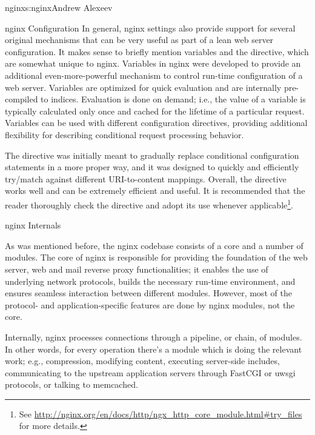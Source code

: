 \begin{aosachapter}{nginx}{s:nginx}{Andrew Alexeev}
\begin{aosasect1}{nginx Configuration}
In general, nginx settings also provide support for several original
mechanisms that can be very useful as part of a lean web server
configuration. It makes sense to briefly mention variables and the
 directive, which are somewhat unique to
nginx. Variables in nginx were developed to provide an additional 
even-more-powerful mechanism to control run-time configuration of a web
server. Variables are optimized for quick evaluation and are
internally pre-compiled to indices. Evaluation is done on demand;
i.e., the value of a variable is typically calculated only once and
cached for the lifetime of a particular request. Variables can be used
with different configuration directives, providing additional
flexibility for describing conditional request processing
behavior. 

The  directive was initially meant to
gradually replace conditional  configuration statements in a
more proper way, and it was designed to quickly and efficiently
try/match against different URI-to-content mappings. Overall, the
 directive works well and can be extremely efficient
and useful. It is recommended that the reader thoroughly check the
 directive and adopt its use whenever
applicable\footnote{See
  \url{http://nginx.org/en/docs/http/ngx_http_core_module.html#try_files}
  for more details.}.

\end{aosasect1}

\begin{aosasect1}{nginx Internals} \label{sec.nginx.internals}

As was mentioned before, the nginx codebase consists of a core and a
number of modules. The core of nginx is responsible for providing the
foundation of the web server, web and mail reverse proxy
functionalities; it enables the use of underlying network protocols,
builds the necessary run-time environment, and ensures seamless
interaction between different modules. However, most of the protocol-
and application-specific features are done by nginx modules, not the
core.

Internally, nginx processes connections through a pipeline, or chain,
of modules. In other words, for every operation there's a module which
is doing the relevant work; e.g., compression, modifying content,
executing server-side includes, communicating to the upstream
application servers through FastCGI or uwsgi protocols, or talking to
memcached.


\end{aosasect1}
\end{aosachapter}
